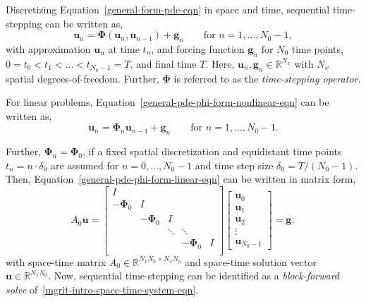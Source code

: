 \documentclass[3p]{elsarticle}
\begin{document}
Discretizing Equation~\eqref{general-form-pde-eqn} in space and time, sequential time-stepping
can be written as,
\begin{equation}
    \boldsymbol{u}_n = \boldsymbol{\Phi} \left( \boldsymbol{u}_n, \boldsymbol{u}_{n-1} \right) + \boldsymbol{g}_n
    \qquad \text{for } n = 1, \ldots, N_0 - 1,
    \label{general-pde-phi-form-nonlinear-eqn}
\end{equation}
with approximation $\boldsymbol{u}_n$ at time $t_n$,
and forcing function $\boldsymbol{g}_n$
for $N_0$ time points, $0 = t_0 < t_1 < \ldots < t_{N_0 - 1} = T$, and final time $T$.
Here, $\boldsymbol{u}_n, \boldsymbol{g}_n \in \mathbb{R}^{N_x}$
with $N_x$ spatial degrees-of-freedom.
Further, $\boldsymbol{\Phi}$ is referred to as the \emph{time-stepping operator}.

For linear problems, Equation~\eqref{general-pde-phi-form-nonlinear-eqn} can be written as,
\begin{equation}
    \boldsymbol{u}_n = \boldsymbol{\Phi}_n \boldsymbol{u}_{n-1} + \boldsymbol{g}_n
    \qquad \text{for } n = 1, \ldots, N_0 - 1.
    \label{general-pde-phi-form-linear-eqn}
\end{equation}

Further, $\boldsymbol{\Phi}_n = \boldsymbol{\Phi}_0$, if a fixed spatial discretization
and equidistant time points $t_n = n \cdot \delta_0$ are assumed for $n = 0, \ldots, N_0 - 1$
and time step size $\delta_0 = T / (N_0 - 1)$.
Then, Equation~\eqref{general-pde-phi-form-linear-eqn} can be written in matrix form,
\begin{equation}
    A_0 \boldsymbol{u} =
    \begin{bmatrix}
        I \\
        -\boldsymbol{\Phi}_0 & I \\
              & -\boldsymbol{\Phi}_0 & I \\
              &       & \ddots & \ddots \\
              &         &       & -\boldsymbol{\Phi}_0 & I \\
    \end{bmatrix} \begin{bmatrix}
        \boldsymbol{u}_0 \\
        \boldsymbol{u}_1 \\
        \boldsymbol{u}_2 \\
        \vdots \\
        \boldsymbol{u}_{N_0 - 1}
    \end{bmatrix}
    = \boldsymbol{g},
    \label{mgrit-intro-space-time-system-eqn}
\end{equation}
with space-time matrix $A_0 \in \mathbb{R}^{N_x N_0 \times N_x N_0}$
and space-time solution vector $\boldsymbol{u} \in \mathbb{R}^{N_x N_0}$.
Now, sequential time-stepping can be identified as a \emph{block-forward solve}
of~\eqref{mgrit-intro-space-time-system-eqn}.
\end{document}
